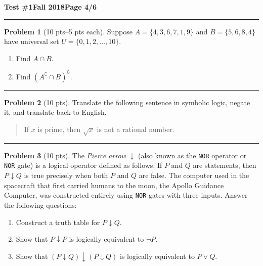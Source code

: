 \documentclass[11pt]{article}
\theoremstyle{definition}
\newtheorem{problem}{Problem}
\begin{document}
\newpage

\hfill{\large\bf Test \#1}\hfill{\large\bf Fall 2018}\hfill{\large\bf Page 4/6}\hrule

\bigskip

\begin{problem}[10 pts--5 pts each]
  Suppose $A = \{4,3,6,7,1,9\}$ and $B= \{5,6,8,4\}$ have universal set $U=\{0,1,2,\dotsc, 10\}$.
  \begin{enumerate}
  \item Find $A \cap B$.
    \vspace{1cm}
  \item Find $(A^\complement \cap B)^\complement$.
    \vspace{1.5cm}
  \end{enumerate}
\end{problem}
\hrule

\begin{problem}[10 pts]
  Translate the following sentence in symbolic logic, negate it, and translate back to English.
  \begin{quote}
    If $x$ is prime, then $\sqrt{x}$ is not a rational number.
  \end{quote}

  \vspace{4cm}
\end{problem}
\hrule

\begin{problem}[10 pts]
  The \emph{Pierce arrow} $\downarrow$ (also known as the \texttt{NOR} operator or \texttt{NOR} gate) is a logical
  operator defined as follows: If $P$ and $Q$ are statements, then $P \downarrow Q$ is true precisely when both $P$ and
  $Q$ are false.  The computer used in the spacecraft that first carried humans to the moon, the Apollo Guidance
  Computer, was constructed entirely using \texttt{NOR} gates with three inputs.  Answer the following questions:
  \begin{enumerate}
  \item Construct a truth table for $P\downarrow Q$.
    \vspace{2cm}
  \item Show that $P \downarrow P$ is logically equivalent to $\lnot P$.
    \vspace{2cm}
  \item Show that $(P \downarrow Q) \downarrow (P \downarrow Q)$ is logically equivalent to $P \lor Q$.
  \end{enumerate}
\end{problem}
\newpage
\end{document}
